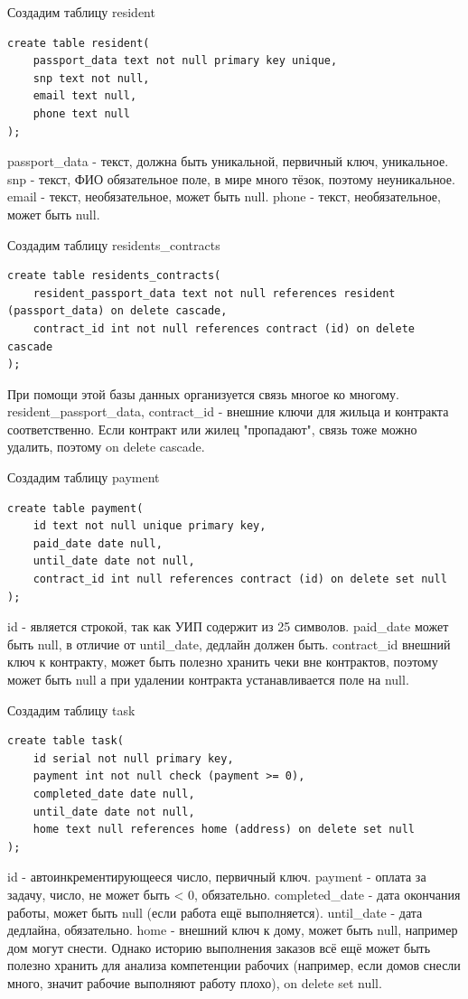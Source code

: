 \documentclass[a4paper,14pt]{extarticle}
\begin{document}
\begin{enumerate}[1.]
Создадим таблицу resident
\begin{verbatim}
create table resident(
    passport_data text not null primary key unique,
    snp text not null,
    email text null,
    phone text null
);
\end{verbatim}
passport\_data - текст, должна быть уникальной, первичный ключ, уникальное.
snp - текст, ФИО обязательное поле, в мире много тёзок, поэтому неуникальное.
email - текст, необязательное, может быть null.
phone - текст, необязательное, может быть null.

Создадим таблицу residents\_contracts
\begin{verbatim}
create table residents_contracts(
	resident_passport_data text not null references resident (passport_data) on delete cascade,
	contract_id int not null references contract (id) on delete cascade
);
\end{verbatim}
При помощи этой базы данных организуется связь многое ко многому.
resident\_passport\_data, contract\_id - внешние ключи для 
жильца и контракта соответственно. Если контракт или 
жилец "пропадают", связь тоже можно удалить, поэтому
on delete cascade.

Создадим таблицу payment
\begin{verbatim}
create table payment(
	id text not null unique primary key,
	paid_date date null,
	until_date date not null,
	contract_id int null references contract (id) on delete set null
);
\end{verbatim}
id - является строкой, так как УИП содержит из 25 символов.
paid\_date может быть null, в отличие от until\_date, дедлайн должен быть.
contract\_id внешний ключ к контракту, может быть полезно хранить чеки
вне контрактов, поэтому может быть null а при удалении контракта 
устанавливается поле на null.

Создадим таблицу task
\begin{verbatim}
create table task(
    id serial not null primary key,
    payment int not null check (payment >= 0),
    completed_date date null,
    until_date date not null,
    home text null references home (address) on delete set null
);
\end{verbatim}
id - автоинкрементирующееся число, первичный ключ.
payment - оплата за задачу, число, не может быть < 0, обязательно.
completed\_date - дата окончания работы, может быть null (если работа ещё выполняется).
until\_date - дата дедлайна, обязательно.
home - внешний ключ к дому, может быть null, например дом могут снести. 
Однако историю выполнения заказов
всё ещё может быть полезно хранить для анализа компетенции рабочих
(например, если домов снесли много, значит рабочие выполняют работу плохо), 
on delete set null.


\end{enumerate}
\end{document}
